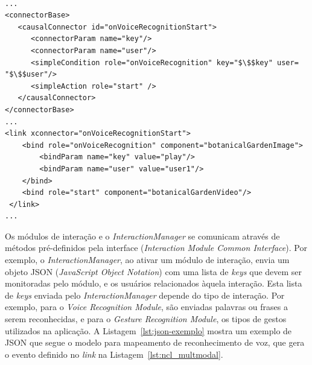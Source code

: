 \begin{lstlisting}[language=ncl,label=lst:ncl_multmodal, caption={Conector e elo para interação mutimodal em NCL estendido}]

...
<connectorBase>
   <causalConnector id="onVoiceRecognitionStart">
      <connectorParam name="key"/>
      <connectorParam name="user"/>      
      <simpleCondition role="onVoiceRecognition" key="$\$$key" user= "$\$$user"/>
      <simpleAction role="start" />
   </causalConnector>  
</connectorBase>
...
<link xconnector="onVoiceRecognitionStart">
 	<bind role="onVoiceRecognition" component="botanicalGardenImage">
  		<bindParam name="key" value="play"/>
   		<bindParam name="user" value="user1"/>
 	</bind>
 	<bind role="start" component="botanicalGardenVideo"/>
 </link> 
...
\end{lstlisting}


Os módulos de interação e o \textit{InteractionManager} se comunicam através de métodos pré-definidos pela interface (\textit{Interaction Module Common Interface}). Por exemplo, o \textit{InteractionManager}, ao ativar um módulo de interação, envia um objeto JSON (\textit{JavaScript Object Notation}) com uma lista de \textit{keys} que devem ser monitoradas pelo módulo, e os usuários relacionados àquela interação. Esta lista de \textit{keys} enviada pelo \textit{InteractionManager} depende do tipo de interação. Por exemplo, para o \textit{Voice Recognition Module}, são enviadas palavras ou frases a serem reconhecidas, e para o \textit{Gesture Recognition Module}, os tipos de gestos utilizados na aplicação. A Listagem~\ref{lst:json-exemplo} mostra um exemplo de JSON que segue o modelo para mapeamento de reconhecimento de voz, que gera o evento definido no \textit{link} na Listagem~\ref{lst:ncl_multmodal}.

